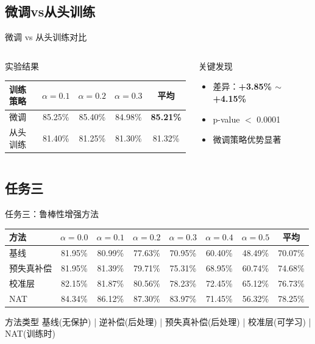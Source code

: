 \documentclass[aspectratio=169]{beamer}
\begin{document}
\subsection{微调vs从头训练}
\begin{frame}{微调 vs 从头训练对比}
\begin{columns}
\begin{block}{实验结果}
\begin{table}
\centering
\begin{tabular}{lcccc}
\toprule
\textbf{训练策略} & $\alpha=0.1$ & $\alpha=0.2$ & $\alpha=0.3$ & \textbf{平均} \\
\midrule
微调 & 85.25\% & 85.40\% & 84.98\% & \textbf{85.21\%} \\
从头训练 & 81.40\% & 81.25\% & 81.30\% & 81.32\% \\
\bottomrule
\end{tabular}
\end{table}
\end{block}
\begin{block}{关键发现}
\begin{itemize}
\item 差异：\textbf{+3.85\% $\sim$ +4.15\%}
\item p-value $<$ 0.0001
\item 微调策略优势显著
\end{itemize}
\end{block}
\end{columns}
\end{frame}

\subsection{任务三}
\begin{frame}{任务三：鲁棒性增强方法}
\begin{table}
\centering
\begin{tabular}{lccccccc}
\toprule
\textbf{方法} & $\alpha=0.0$ & $\alpha=0.1$ & $\alpha=0.2$ & $\alpha=0.3$ & $\alpha=0.4$ & $\alpha=0.5$ & \textbf{平均} \\
\midrule
基线 & 81.95\% & 80.99\% & 77.63\% & 70.95\% & 60.40\% & 48.49\% & 70.07\% \\
预失真补偿 & 81.95\% & 81.39\% & 79.71\% & 75.31\% & 68.95\% & 60.74\% & 74.68\% \\
校准层 & 82.15\% & 81.87\% & 80.56\% & 78.23\% & 72.45\% & 65.12\% & 76.73\% \\
NAT & 84.34\% & 86.12\% & 87.30\% & 83.97\% & 71.45\% & 56.32\% & 78.25\% \\
\bottomrule
\end{tabular}
\end{table}
\vfill
\begin{block}{方法类型}
基线(无保护) | 逆补偿(后处理) | 预失真补偿(后处理) | 校准层(可学习) | NAT(训练时)
\end{block}
\end{frame}
\end{document}

